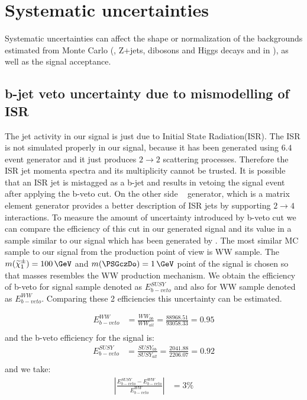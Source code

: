 \section{Systematic uncertainties}
\label{sect:sys}
Systematic uncertainties can affect the shape or normalization of the
backgrounds estimated from Monte Carlo (\ttbar, Z+jets, dibosons and Higgs decays and \wjets in \tauTau \bintwo), 
as well as the signal acceptance. 

\subsection{b-jet veto uncertainty due to mismodelling of ISR}
The jet activity in our signal is just due to Initial State Radiation(ISR). The ISR is not simulated properly in our signal, because it has been generated using \PYTHIA $6.4$ event generator and it just produces $2 \rightarrow 2$ scattering processes. Therefore the ISR jet momenta spectra and its multiplicity cannot be trusted. It is possible that an ISR jet is mistagged as a b-jet and results in vetoing the signal event after applying the b-veto cut. On the other side \MADGRAPH ~\cite{MADGRAPH} generator, which is a matrix element generator provides a better description of ISR jets by supporting $2 \rightarrow 4$ interactions. To measure the amount of uncertainty introduced by b-veto cut we can compare the efficiency of this cut in our generated signal and its value in a sample similar to our signal which has been generated by \MADGRAPH. 
The most similar MC sample to our signal from the production point of view is WW sample. The $m(\chione) = 100\,\GeV$ and $m(\PSGczDo) = 1\,\GeV$ point of the signal is chosen so that masses resembles the WW production mechanism. %
We obtain the efficiency of b-veto for signal sample denoted as $E^{SUSY}_{b-veto}$ and also for WW sample denoted as $E^{WW}_{b-veto}$.
Comparing these 2 efficiencies this uncertainty can be estimated.

\begin{align}
E^{WW}_{b-veto} &= \frac{WW_{0b}}{WW_{all}} = \frac{88968.51}{93058.33} = 0.95\\ \nonumber
\end{align}
and the b-veto efficiency for the signal is:
\begin{align}
E^{SUSY}_{b-veto} &= \frac{SUSY_{0b}}{SUSY_{all}} = \frac{2041.88}{2206.07} = 0.92 \\ \nonumber
\end{align}
and we take:
\begin{align}
|\frac{E^{SUSY}_{b-veto}-E^{WW}_{b-veto}}{E^{WW}_{b-veto}}| &= 3 \% \\ \nonumber
\end{align}

